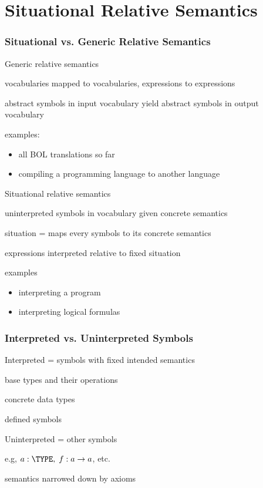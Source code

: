 \section{Situational Relative Semantics}

\begin{frame}\frametitle{Situational vs. Generic Relative Semantics}
\begin{blockitems}{Generic relative semantics}
\item vocabularies mapped to vocabularies, expressions to expressions
\item abstract symbols in input vocabulary yield abstract symbols in output vocabulary
\item examples:
 \begin{itemize}
 \item all BOL translations so far
 \item compiling a programming language to another language
 \end{itemize}
\end{blockitems}

\begin{blockitems}{Situational relative semantics}
\item uninterpreted symbols in vocabulary given concrete semantics
\item situation = maps every symbols to its concrete semantics
\item expressions interpreted relative to fixed situation
\item examples
 \begin{itemize}
 \item interpreting a program 
 \item interpreting logical formulas 
 \end{itemize}
\end{blockitems}
\end{frame}

\begin{frame}\frametitle{Interpreted vs. Uninterpreted Symbols}
\begin{blockitems}{Interpreted = symbols with fixed intended semantics}
\item base types and their operations 
\item concrete data types 
\item defined symbols 
\end{blockitems}

\begin{blockitems}{Uninterpreted = other symbols}
\item e.g, $a:\TYPE,\;f:a\to a$, etc.
\item semantics narrowed down by axioms 
\end{blockitems}
\end{frame}

